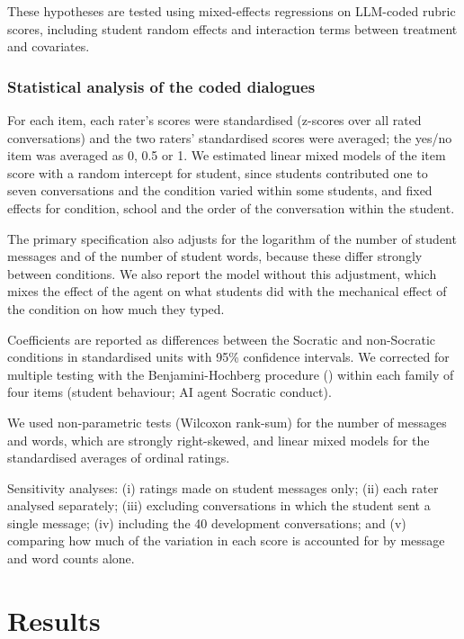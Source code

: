 \documentclass[
  12pt,
]{article}
\begin{document}
These hypotheses are tested using mixed-effects regressions on LLM-coded rubric scores, including student random effects and interaction terms between treatment and covariates.

\subsubsection{Statistical analysis of the coded dialogues}\label{sec:analysis-llm}

For each item, each rater's scores were standardised (z-scores over all rated conversations) and the two raters' standardised scores were averaged; the yes/no item was averaged as 0, 0.5 or 1. We estimated linear mixed models of the item score with a random intercept for student, since students contributed one to seven conversations and the condition varied within some students, and fixed effects for condition, school and the order of the conversation within the student.

The primary specification also adjusts for the logarithm of the number of student messages and of the number of student words, because these differ strongly between conditions. We also report the model without this adjustment, which mixes the effect of the agent on what students did with the mechanical effect of the condition on how much they typed.

Coefficients are reported as differences between the Socratic and non-Socratic conditions in standardised units with 95\% confidence intervals. We corrected for multiple testing with the Benjamini-Hochberg procedure () within each family of four items (student behaviour; AI agent Socratic conduct).

We used non-parametric tests (Wilcoxon rank-sum) for the number of messages and words, which are strongly right-skewed, and linear mixed models for the standardised averages of ordinal ratings.

Sensitivity analyses: (i) ratings made on student messages only; (ii) each rater analysed separately; (iii) excluding conversations in which the student sent a single message; (iv) including the 40 development conversations; and (v) comparing how much of the variation in each score is accounted for by message and word counts alone.

\section{Results}\label{sec:results}
\end{document}
